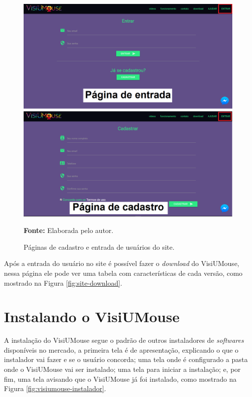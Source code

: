 \begin{figure}[H]
\caption{Páginas de cadastro e entrada de usuários do site.} 
\centering \includegraphics[scale=0.45]{img/site-entrar.png}

{\fontsize{11}{11}\selectfont \textbf{Fonte:} Elaborada pelo autor.}
\label{fig:site-entrar}
\end{figure}

Após a entrada do usuário no site é possível fazer o \textit{download} do VisiUMouse, nessa página ele pode ver uma tabela com características de cada versão, como mostrado na Figura \ref{fig:site-download}.


\section{Instalando o VisiUMouse}
A instalação do VisiUMouse segue o padrão de outros instaladores de \textit{softwares} disponíveis no mercado, a primeira tela é de apresentação, explicando o que o instalador vai fazer e se o usuário concorda; uma tela onde é configurado a pasta onde o VisiUMouse vai ser instalado; uma tela para iniciar a instalação; e, por fim, uma tela avisando que o VisiUMouse já foi instalado, como mostrado na Figura \ref{fig:visiumouse-instalador}.

